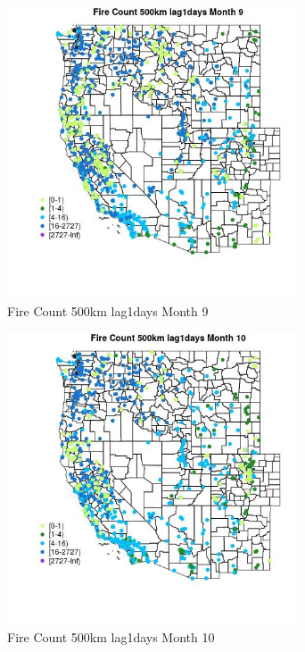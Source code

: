 \begin{figure} 
\centering  
\includegraphics[width=0.77\textwidth]{Code_Outputs/Report_ML_input_PM25_Step4_part_f_de_duplicated_aveswNAs_MapObsMo9Fire_Count_500km_lag1days.jpg} 
\caption{\label{fig:Report_ML_input_PM25_Step4_part_f_de_duplicated_aveswNAsMapObsMo9Fire_Count_500km_lag1days}Fire Count 500km lag1days Month 9} 
\end{figure} 
 

\begin{figure} 
\centering  
\includegraphics[width=0.77\textwidth]{Code_Outputs/Report_ML_input_PM25_Step4_part_f_de_duplicated_aveswNAs_MapObsMo10Fire_Count_500km_lag1days.jpg} 
\caption{\label{fig:Report_ML_input_PM25_Step4_part_f_de_duplicated_aveswNAsMapObsMo10Fire_Count_500km_lag1days}Fire Count 500km lag1days Month 10} 
\end{figure} 
 

